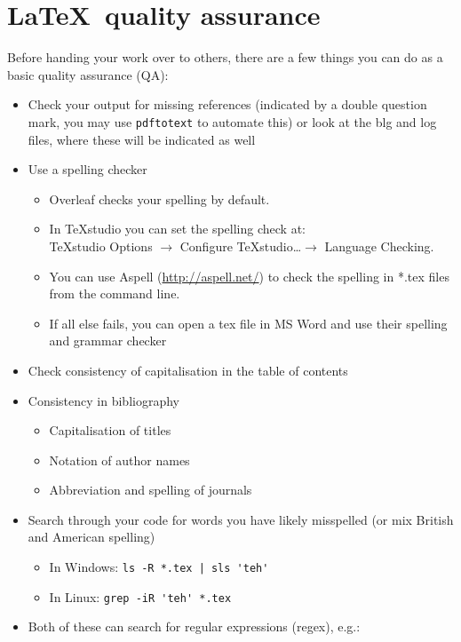 \chapter{\LaTeX\ quality assurance}

Before handing your work over to others, there are a few things you can do as a basic quality assurance (QA):
\begin{itemize}
  \item Check your output for missing references (indicated by a double question mark, you may use \verb|pdftotext| to automate this) or look at the blg and log files, where these will be indicated as well
  \item Use a spelling checker
  \begin{itemize}
    \item Overleaf checks your spelling by default.
    \item In \TeX{}studio you can set the spelling check at:\\
      \TeX{}studio Options \(\to\) Configure \TeX{}studio\ldots \(\to\) Language Checking.
    \item You can use Aspell (\url{http://aspell.net/}) to check the spelling in *.tex files from the command line.
    \item If all else fails, you can open a tex file in MS Word and use their spelling and grammar checker
  \end{itemize}
  \item Check consistency of capitalisation in the table of contents
  \item Consistency in bibliography
  \begin{itemize}
    \item Capitalisation of titles
    \item Notation of author names
    \item Abbreviation and spelling of journals
  \end{itemize}
  \item Search through your code for words you have likely misspelled (or mix British and American spelling)
  \begin{itemize}
    \item In Windows: \verb"ls -R *.tex | sls 'teh'"
    \item In Linux: \verb|grep -iR 'teh' *.tex|
  \end{itemize}
  \item Both of these can search for regular expressions (regex), e.g.:
  \begin{itemize}

\end{itemize}
\end{itemize}
